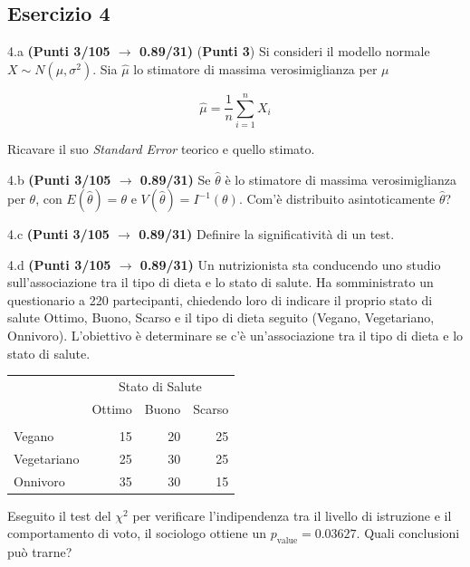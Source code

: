 \documentclass[
  11pt,
]{book}
\theoremstyle{mytheoremstyle}
\theoremstyle{mydefstyle}
\begin{document}
\subsection{Esercizio 4}\label{esercizio-4-37}

4.a \textbf{(Punti 3/105 \(\rightarrow\) 0.89/31)} (\textbf{Punti 3}) Si consideri il modello normale \(X\sim N(\mu,\sigma^2)\). Sia \(\hat\mu\) lo stimatore di massima verosimiglianza per \(\mu\)

\[
  \hat\mu = \frac 1n \sum_{i=1}^n X_i
\]

Ricavare il suo \emph{Standard Error} teorico e quello stimato.

4.b \textbf{(Punti 3/105 \(\rightarrow\) 0.89/31)} Se \(\hat\theta\) è lo stimatore di massima verosimiglianza
per \(\theta\), con \(E(\hat\theta)=\theta\) e \(V(\hat\theta)=I^{-1}(\theta)\).
Com'è distribuito asintoticamente \(\hat\theta\)?

4.c \textbf{(Punti 3/105 \(\rightarrow\) 0.89/31)} Definire la significatività di un test.

4.d \textbf{(Punti 3/105 \(\rightarrow\) 0.89/31)} Un nutrizionista sta conducendo uno studio sull'associazione tra il tipo di dieta e lo stato di salute. Ha somministrato un questionario a 220 partecipanti, chiedendo loro di indicare il proprio stato di salute Ottimo, Buono, Scarso e il tipo di dieta seguito (Vegano, Vegetariano, Onnivoro). L'obiettivo è determinare se c'è un'associazione tra il tipo di dieta e lo stato di salute.

\begin{table}[H]
\centering\centering\centering
\begin{tabular}{lrrr}
\toprule
\multicolumn{1}{c}{ } & \multicolumn{3}{c}{Stato di Salute} \\
\cmidrule(l{3pt}r{3pt}){2-4}
  & Ottimo & Buono & Scarso\\
\midrule
\addlinespace[0.3em]
\multicolumn{4}{l}{\textbf{Tipo di Dieta}}\\
\hspace{1em}Vegano & 15 & 20 & 25\\
\hspace{1em}Vegetariano & 25 & 30 & 25\\
\hspace{1em}Onnivoro & 35 & 30 & 15\\
\bottomrule
\end{tabular}
\end{table}

Eseguito il test del \(\chi^2\) per verificare l'indipendenza tra il livello di istruzione e il comportamento di voto, il sociologo ottiene un \(p_\text{value}=0.03627\). Quali conclusioni può trarne?
\end{document}
